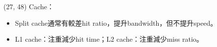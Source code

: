 \item \begin{theorem}{(27, 48)} Cache：\begin{itemize}
        \item Split cache通常有較差hit ratio，提升bandwidth，但不提升speed。
        \item L1 cache：注重減少hit time；L2 cache：注重減少miss ratio。
    \end{itemize}
\end{theorem}
